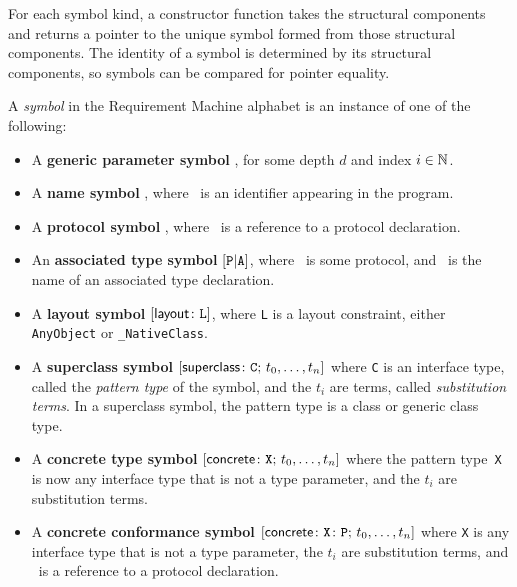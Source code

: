 \documentclass[../generics]{subfiles}
\begin{document}
For each symbol kind, a constructor function takes the structural components and returns a pointer to the unique symbol formed from those structural components. The identity of a symbol is determined by its structural components, so symbols can be compared for pointer equality.
\begin{definition}
A \emph{symbol} in the Requirement Machine alphabet is an instance of one of the following:
\begin{itemize}
\item A \textbf{generic parameter symbol} , for some depth $d$ and index $i\in\mathbb{N}$.
\item A \textbf{name symbol} \nA, where \nA\ is an identifier appearing in the program.
\item A \textbf{protocol symbol} \pP, where \tP\ is a reference to a protocol declaration.
\item An \textbf{associated type symbol} $[\texttt{P}|\texttt{A}]$, where \tP\ is some protocol, and \nA\ is the name of an associated type declaration.
\item A \textbf{layout symbol} $[\mathsf{layout}\colon\texttt{L}]$, where \texttt{L} is a layout constraint, either \texttt{AnyObject} or \verb|_NativeClass|.
\item A \textbf{superclass symbol} $[\mathsf{superclass}\colon \texttt{C};\,t_0,\ldots,t_n]$ where \texttt{C} is an interface type, called the \emph{pattern type} of the symbol, and the $t_i$ are terms, called \emph{substitution terms}. In a superclass symbol, the pattern type is a class or generic class type.
\item A \textbf{concrete type symbol} $[\mathsf{concrete}\colon \texttt{X};\,t_0,\ldots,t_n]$ where the pattern type~\texttt{X} is now any interface type that is not a type parameter, and the $t_i$ are substitution terms.
\item A \textbf{concrete conformance symbol} $[\mathsf{concrete}\colon \texttt{X}\colon\texttt{P};\,t_0,\ldots,t_n]$ where \texttt{X} is any interface type that is not a type parameter, the $t_i$ are substitution terms, and \tP\ is a reference to a protocol declaration.
\end{itemize}
\end{definition}
\end{document}
